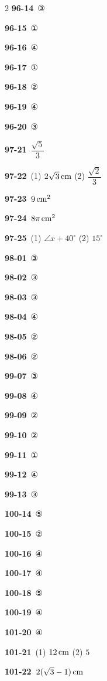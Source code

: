 \documentclass[10pt,a4paper]{article}
\begin{document}
\begin{multicols}{2}
\noindent\textbf{96-14}\ ③\par
\noindent\textbf{96-15}\ ①\par
\noindent\textbf{96-16}\ ④\par
\noindent\textbf{96-17}\ ①\par
\noindent\textbf{96-18}\ ②\par
\noindent\textbf{96-19}\ ④\par
\noindent\textbf{96-20}\ ③\par
\noindent\textbf{97-21}\ $\dfrac{\sqrt{5}}{3}$\par
\noindent\textbf{97-22}\ (1) $2\sqrt{3}\mkern3mu \mathrm{cm}$ (2) $\dfrac{\sqrt{2}}{3}$\par
\noindent\textbf{97-23}\ $9\mkern3mu \mathrm{cm}^2$\par
\noindent\textbf{97-24}\ $8\pi\mkern3mu \mathrm{cm}^2$\par
\noindent\textbf{97-25}\ (1) $\angle x+40^\circ$ (2) $15^\circ$\par
\noindent\textbf{98-01}\ ③\par
\noindent\textbf{98-02}\ ③\par
\noindent\textbf{98-03}\ ③\par
\noindent\textbf{98-04}\ ④\par
\noindent\textbf{98-05}\ ②\par
\noindent\textbf{98-06}\ ②\par
\noindent\textbf{99-07}\ ③\par
\noindent\textbf{99-08}\ ④\par
\noindent\textbf{99-09}\ ②\par
\noindent\textbf{99-10}\ ②\par
\noindent\textbf{99-11}\ ①\par
\noindent\textbf{99-12}\ ④\par
\noindent\textbf{99-13}\ ③\par
\noindent\textbf{100-14}\ ⑤\par
\noindent\textbf{100-15}\ ②\par
\noindent\textbf{100-16}\ ④\par
\noindent\textbf{100-17}\ ④\par
\noindent\textbf{100-18}\ ⑤\par
\noindent\textbf{100-19}\ ④\par
\noindent\textbf{101-20}\ ④\par
\noindent\textbf{101-21}\ (1) $12\mkern3mu \mathrm{cm}$ (2) $5$\par
\noindent\textbf{101-22}\ $2(\sqrt{3}-1)\mkern3mu \mathrm{cm}$\par

\end{multicols}
\end{document}
